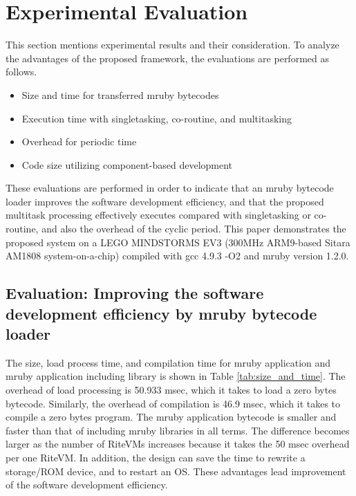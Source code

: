 \documentclass{sig-alternate-05-2015}
\begin{document}
\section{Experimental Evaluation}
\label{sec:Evaluation}
This section mentions experimental results and their consideration.
To analyze the advantages of the proposed framework, the evaluations are performed as follows.
\begin{itemize}
    \item Size and time for transferred mruby bytecodes
    \item Execution time with singletasking, co-routine, and multitasking
    \item Overhead for periodic time
    \item Code size utilizing component-based development 
\end{itemize}

These evaluations are performed in order to indicate that an mruby bytecode loader improves the software development efficiency, and that the proposed multitask processing effectively executes compared with singletasking or co-routine, and also the overhead of the cyclic period.
This paper demonstrates the proposed system on a LEGO MINDSTORMS EV3 \cite{par:EV3} (300MHz ARM9-based Sitara AM1808 system-on-a-chip) compiled with gcc 4.9.3 -O2 and mruby version 1.2.0.

\subsection{Evaluation: Improving the software development efficiency by mruby bytecode loader}
The size, load process time, and compilation time for mruby application and mruby application including library is shown in Table \ref{tab:size_and_time}.
The overhead of load processing is 50.933 msec, which it takes to load a zero bytes bytecode.
Similarly, the overhead of compilation is 46.9 msec, which it takes to compile a zero bytes program.
The mruby application bytecode is smaller and faster than that of including mruby libraries in all terms.
The difference becomes larger as the number of RiteVMs increases because it takes the 50 msec overhead per one RiteVM. 
In addition, the design can save the time to rewrite a storage/ROM device, and to restart an OS.
These advantages lead improvement of the software development efficiency.
\end{document}
